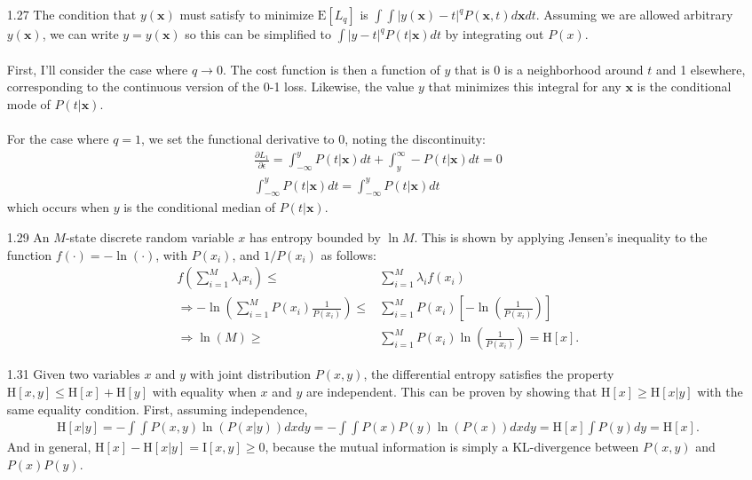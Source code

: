 \documentclass[]{article}
\begin{document}
\begin{enumerate}
 	\item[1.27] The condition that $y(\mathbf{x})$ must satisfy to minimize $\text{E}[L_q]$ is $\int \int |y(\mathbf{x}) - t|^qP(\mathbf{x},t)d\mathbf{x} dt$. Assuming we are allowed arbitrary $y(\mathbf{x})$, we can write $y=y(\mathbf{x})$ so this can be simplified to $ \int |y-t|^qP(t|\mathbf{x})dt$ by integrating out $P(x)$. \\ \\
 	First, I'll consider the case where $q \rightarrow 0$. The cost function is then a function of $y$ that is 0 is a neighborhood around $t$ and 1 elsewhere, corresponding to the continuous version of the 0-1 loss. Likewise, the value $y$ that minimizes this integral for any $\mathbf{x}$ is the conditional mode of $P(t|\mathbf{x})$. \\ \\
 	For the case where $q=1$, we set the functional derivative to 0, noting the discontinuity:
 	\begin{align*}
 	\frac{\partial L_1}{\partial \epsilon} = \int_{-\infty}^y  P(t|\mathbf{x})dt + \int_{y}^{\infty} -P(t|\mathbf{x})dt=0 \\
 	\int_{-\infty}^y  P(t|\mathbf{x})dt = \int_{-\infty}^y  P(t|\mathbf{x})dt 
 	\end{align*}
 	which occurs when $y$ is the conditional median of $P(t|\mathbf{x})$.
 	
 	\item[1.29] An $M$-state discrete random variable $x$ has entropy bounded by $\ln M$. This is shown by applying Jensen's inequality to the function $f(\cdot) = - \ln(\cdot)$, with $P(x_i)$, and $1/P(x_i)$ as follows:
 	\begin{align*}
 	f(\sum_{i=1}^{M}\lambda_i x_i) \leq & \sum_{i = 1}^{M}\lambda_i f(x_i) \\
 	\Rightarrow -\ln\left(\sum_{i = 1}^{M} P(x_i)\frac{1}{P(x_i)}\right) \leq & \sum_{i = 1}^{M} P(x_i) \left[- \ln \left(\frac{1}{P(x_i)} \right) \right] \\
 	\Rightarrow \ln\left(M\right) \geq & \sum_{i = 1}^{M} P(x_i) \ln \left(\frac{1}{P(x_i)} \right) = \text{H}[x].
 	\end{align*}
 	
 	\item[1.31] Given two variables $x$ and $y$ with joint distribution $P(x,y)$, the differential entropy satisfies the property $	\text{H}[x,y] \leq \text{H}[x] + \text{H}[y]$ with equality when $x$ and $y$ are independent. This can be proven by showing that $\text{H}[x] \geq \text{H}[x|y]$ with the same equality condition. First, assuming independence,
 	\begin{align*}
 	\text{H}[x|y] = -\int \int P(x,y) \ln\left(P(x|y)\right) dx dy = -\int \int P(x)P(y) \ln\left(P(x)\right) dx dy = \text{H}[x] \int P(y) dy = \text{H}[x].
 	\end{align*}
 	And in general, $\text{H}[x] - \text{H}[x|y] = \text{I}[x,y] \geq 0 $, because the mutual information is simply a KL-divergence between $P(x,y)$ and $P(x)P(y)$.
 	

\end{enumerate}
\end{document}
